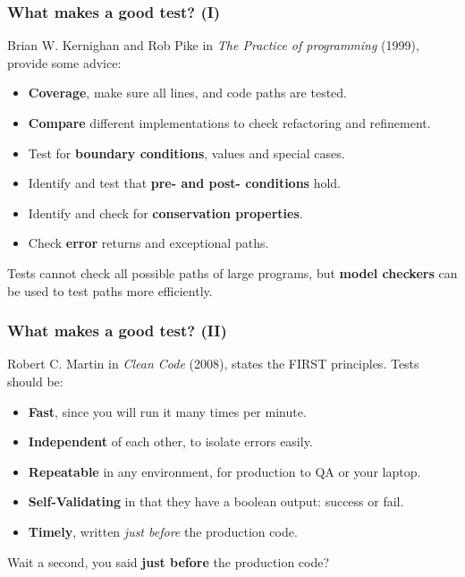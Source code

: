 \documentclass{beamer} %
\newcommand\emc[1]{\textcolor{midred}{\textbf{#1}}}
\begin{document}
\begin{frame}
\frametitle{What makes a good test? (I)}

Brian W. Kernighan and Rob Pike in  \emph{The Practice of programming} (1999), provide some advice:
\begin{itemize}
	\item \emc{Coverage}, make sure all lines, and code paths are tested.
	\item \emc{Compare} different implementations to check refactoring and refinement.
	\item Test for \emc{boundary conditions}, values and special cases.
	\item Identify and test that \emc{pre- and post- conditions} hold.
	\item Identify and check for \emc{conservation properties}.
	\item Check \emc{error} returns and exceptional paths.
\end{itemize}

\vspace{3mm}
Tests cannot check all possible paths of large programs, but \emc{model checkers} can be used to test paths more efficiently.

\end{frame}

\begin{frame}
\frametitle{What makes a good test? (II)}

Robert C. Martin in \emph{Clean Code} (2008), states the FIRST principles. Tests should be:
\begin{itemize}
	\item \emc{Fast}, since you will run it many times per minute.
	\item \emc{Independent} of each other, to isolate errors easily. 
	\item \emc{Repeatable} in any environment, for production to QA or your laptop.
	\item \emc{Self-Validating} in that they have a boolean output: success or fail.
	\item \emc{Timely}, written \emph{just before} the production code.
\end{itemize}

\vspace{5mm}
Wait a second, you said \emc{just before} the production code?

\end{frame}
\end{document}
